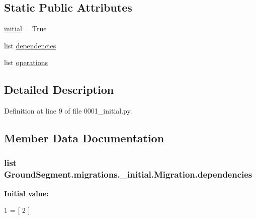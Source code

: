\subsection*{Static Public Attributes}
\begin{DoxyCompactItemize}
\item 
\hyperlink{class_ground_segment_1_1migrations_1_10001__initial_1_1_migration_a460cd47c2c35761869442aae6f00d4af}{initial} = True
\item 
list \hyperlink{class_ground_segment_1_1migrations_1_10001__initial_1_1_migration_a0507743eccb8c8708b40246587df8915}{dependencies}
\item 
list \hyperlink{class_ground_segment_1_1migrations_1_10001__initial_1_1_migration_a44994e17a192fe01d74b92136e977e36}{operations}
\end{DoxyCompactItemize}


\subsection{Detailed Description}


Definition at line 9 of file 0001\+\_\+initial.\+py.



\subsection{Member Data Documentation}
\hypertarget{class_ground_segment_1_1migrations_1_10001__initial_1_1_migration_a0507743eccb8c8708b40246587df8915}{}
\subsubsection[{dependencies}]{\setlength{\rightskip}{0pt plus 5cm}list Ground\+Segment.\+migrations.\+\_\+initial.\+Migration.\+dependencies\hspace{0.3cm}{\ttfamily [static]}}\label{class_ground_segment_1_1migrations_1_10001__initial_1_1_migration_a0507743eccb8c8708b40246587df8915}
{\bfseries Initial value\+:}
\begin{DoxyCode}
1 = [
2     ]
\end{DoxyCode}


